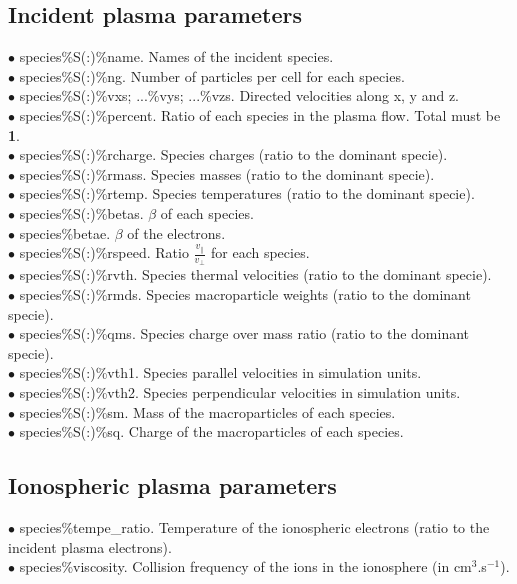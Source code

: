 \documentclass{article}
\begin{document}
\subsection{Incident plasma parameters}
$\bullet$ {\sf  species\%S(:)\%name}. Names of the incident species.\\
$\bullet$ {\sf  species\%S(:)\%ng}. Number of particles per cell for each species.\\
$\bullet$ {\sf  species\%S(:)\%vxs; ...\%vys; ...\%vzs}.  Directed velocities along x, y and z.\\
$\bullet$ {\sf  species\%S(:)\%percent}. Ratio of each species in the plasma flow. Total must be {\bf 1}.\\
$\bullet$ {\sf  species\%S(:)\%rcharge}. Species charges (ratio to the dominant specie).\\
$\bullet$ {\sf  species\%S(:)\%rmass}. Species masses (ratio to the dominant specie).\\
$\bullet$ {\sf  species\%S(:)\%rtemp}. Species temperatures (ratio to the dominant specie).\\
$\bullet$ {\sf  species\%S(:)\%betas}. $\beta$ of each species.\\
$\bullet$ {\sf  species\%betae}. $\beta$ of the electrons.\\
$\bullet$ {\sf  species\%S(:)\%rspeed}. Ratio $\frac{v_\|}{v_\perp}$ for each species.\\
$\bullet$ {\sf  species\%S(:)\%rvth}. Species thermal velocities (ratio to the dominant specie).\\
$\bullet$ {\sf  species\%S(:)\%rmds}. Species macroparticle weights (ratio to the dominant specie).\\
$\bullet$ {\sf  species\%S(:)\%qms}. Species charge over mass ratio (ratio to the dominant specie).\\
$\bullet$ {\sf  species\%S(:)\%vth1}. Species parallel velocities in simulation units.\\
$\bullet$ {\sf  species\%S(:)\%vth2}. Species perpendicular velocities in simulation units.\\
$\bullet$ {\sf  species\%S(:)\%sm}. Mass of the macroparticles of each species.\\
$\bullet$ {\sf  species\%S(:)\%sq}. Charge of the macroparticles of each species.\\

\subsection{Ionospheric plasma parameters}
$\bullet$ {\sf  species\%tempe\_ratio}. Temperature of the ionospheric electrons (ratio to the incident plasma electrons).\\
$\bullet$ {\sf  species\%viscosity}. Collision frequency of the ions in the ionosphere (in cm$^3$.s$^{-1}$).\\
\end{document}
